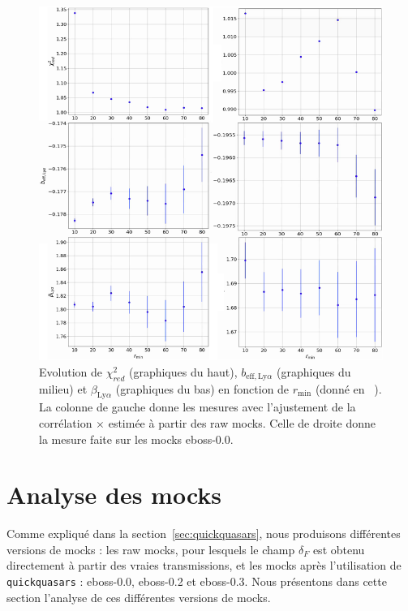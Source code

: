 \begin{figure}
  \centering
  \includegraphics[scale=0.6]{chi2_vs_rmin}
  \caption{Evolution de $\chi_{red}^2$ (graphiques du haut), $b_{\mathrm{eff},\mathrm{Ly}\alpha}$ (graphiques du milieu) et $\beta_{\mathrm{Ly}\alpha}$ (graphiques du bas) en fonction de $r_{\mathrm{min}}$ (donné en \si{\perh\Mpc}). La colonne de gauche donne les mesures avec l'ajustement de la corrélation \lya{}$\times$\lya{} estimée à partir des raw mocks. Celle de droite donne la mesure faite sur les mocks eboss-0.0.}
  \label{fig:chi2_vs_rmin}
\end{figure}

\newpage
\section{Analyse des mocks}
\label{sec:mock_ana}
Comme expliqué dans la section~\ref{sec:quickquasars}, nous produisons différentes versions de mocks : les raw mocks, pour lesquels le champ $\delta_F$ est obtenu directement à partir des vraies transmissions, et les mocks après l'utilisation de \texttt{quickquasars} : eboss-0.0, eboss-0.2 et eboss-0.3.
Nous présentons dans cette section l'analyse de ces différentes versions de mocks.

